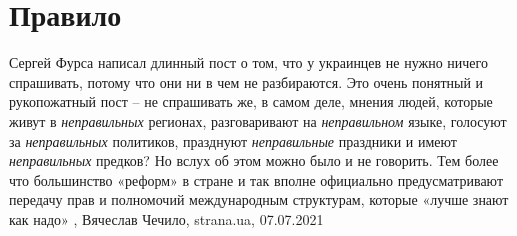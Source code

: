  
 
 
 
 
\chapter{Правило}

Сергей Фурса написал длинный пост о том, что у украинцев не нужно ничего
спрашивать, потому что они ни в чем не разбираются. Это очень понятный и
рукопожатный пост – не спрашивать же, в самом деле, мнения людей, которые живут
в \emph{неправильных} регионах, разговаривают на \emph{неправильном} языке, голосуют за
\emph{неправильных} политиков, празднуют \emph{неправильные} праздники и имеют \emph{неправильных}
предков?  Но вслух об этом можно было и не говорить. Тем более что большинство
«реформ» в стране и так вполне официально предусматривают передачу прав и
полномочий международным структурам, которые «лучше знают как надо»
, Вячеслав Чечило, strana.ua, 07.07.2021
